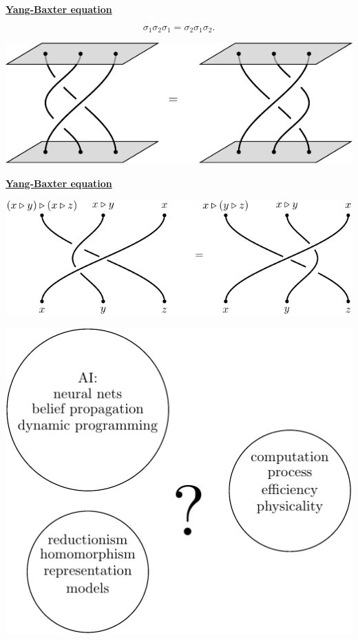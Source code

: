 \documentclass[11pt]{article}
\def\heading #1{\centerline{\underline{\bf\LARGE #1}}}
\def\vsp {\vskip 0.5cm}
\begin{document}
\newpage %

\heading{Yang-Baxter equation}
\vsp
$$\sigma_1 \sigma_2 \sigma_1 = \sigma_2 \sigma_1 \sigma_2.$$
\vsp
\centerline{\includegraphics[]{pic-braid.pdf}}


\newpage %

\heading{Yang-Baxter equation}
\vsp
\centerline{\includegraphics[]{pic-braid-shelf.pdf}}

\newpage %

\centerline{\includegraphics[]{pic-question.pdf}}
\end{document}
